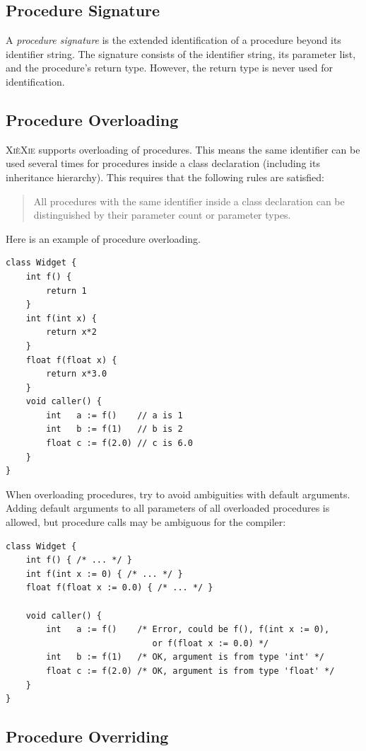 \documentclass[a5paper]{report}
\def\xiexie{\textsc{Xi\`eXie}\xspace}
\begin{document}
\subsection{Procedure Signature}

A \textit{procedure signature} is the extended identification of a procedure beyond its identifier string.
The signature consists of the identifier string, its parameter list, and the procedure's return type.
However, the return type is never used for identification.

\subsection{Procedure Overloading}

\xiexie supports overloading of procedures. This means the same identifier can be used several times
for procedures inside a class declaration (including its inheritance hierarchy).
This requires that the following rules are satisfied:
\begin{quote}
	All procedures with the same identifier inside a class declaration can be distinguished by their
	parameter count or parameter types.
\end{quote}
Here is an example of procedure overloading.
\begin{lstlisting}
class Widget {
    int f() {
        return 1
    }
    int f(int x) {
        return x*2
    }
    float f(float x) {
        return x*3.0
    }
    void caller() {
        int   a := f()    // a is 1
        int   b := f(1)   // b is 2
        float c := f(2.0) // c is 6.0
    }
}
\end{lstlisting}
When overloading procedures, try to avoid ambiguities with default arguments. Adding default arguments
to all parameters of all overloaded procedures is allowed, but procedure calls may be ambiguous for the compiler:
\begin{lstlisting}
class Widget {
    int f() { /* ... */ }
    int f(int x := 0) { /* ... */ }
    float f(float x := 0.0) { /* ... */ }
    
    void caller() {
        int   a := f()    /* Error, could be f(), f(int x := 0),
                             or f(float x := 0.0) */
        int   b := f(1)   /* OK, argument is from type 'int' */
        float c := f(2.0) /* OK, argument is from type 'float' */
    }
}
\end{lstlisting}

\subsection{Procedure Overriding}
\end{document}
